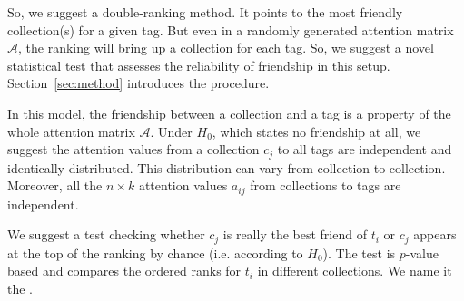 \documentclass{llncs}
\begin{document}
So, we suggest a double-ranking method. It points to the most friendly collection(s) for a given tag. But even in a randomly generated attention matrix $\mathcal{A}$, the ranking will bring up a collection for each tag. So, we suggest a novel statistical test that assesses the reliability of friendship in this setup. Section~\ref{sec:method} introduces the procedure.




In this model, the friendship between a collection and a tag is a property of the whole attention matrix $\mathcal{A}$.
Under $H_0$, which states no friendship at all, we suggest the attention values from a collection $c_j$ to all tags are independent and identically distributed.
This distribution can vary from collection to collection. Moreover, all the $n \times k$ attention values $a_{ij}$ from collections to tags are independent.

We suggest a test checking whether $c_j$ is really the best friend of $t_i$ or $c_j$ appears at the top of the ranking by chance (i.e. according to $H_0$). The test is $p$-value based and compares the ordered ranks for $t_i$ in different collections. We name it the .

\end{document}
